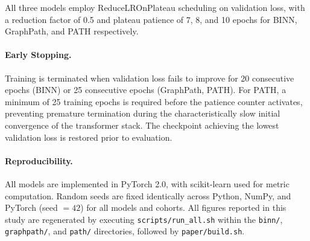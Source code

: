 All three models employ ReduceLROnPlateau scheduling on validation loss, with a reduction factor of 0.5 and plateau patience of 7, 8, and 10 epochs for BINN, GraphPath, and PATH respectively.

\paragraph{Early Stopping.}
Training is terminated when validation loss fails to improve for 20 consecutive epochs (BINN) or 25 consecutive epochs (GraphPath, PATH). For PATH, a minimum of 25 training epochs is required before the patience counter activates, preventing premature termination during the characteristically slow initial convergence of the transformer stack. The checkpoint achieving the lowest validation loss is restored prior to evaluation.

\paragraph{Reproducibility.}
All models are implemented in PyTorch 2.0, with scikit-learn used for metric computation. Random seeds are fixed identically across Python, NumPy, and PyTorch (seed $= 42$) for all models and cohorts. All figures reported in this study are regenerated by executing \texttt{scripts/run\_all.sh} within the \texttt{binn/}, \texttt{graphpath/}, and \texttt{path/} directories, followed by \texttt{paper/build.sh}.
